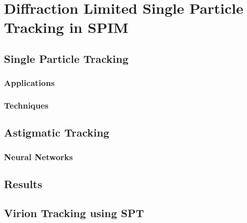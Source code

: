\ifpdf
    \graphicspath{{Chapter5/Figs/Raster/}{Chapter5/Figs/PDF/}{Chapter5/Figs/}}
\else
    \graphicspath{{Chapter5/Figs/Vector/}{Chapter5/Figs/}}
\fi

\chapter{Diffraction Limited Single Particle Tracking in SPIM}
\section{Single Particle Tracking}
\subsection{Applications}
\subsection{Techniques}
\section{Astigmatic Tracking}
\subsection{Neural Networks}
\section{Results}
\section{Virion Tracking using SPT}
